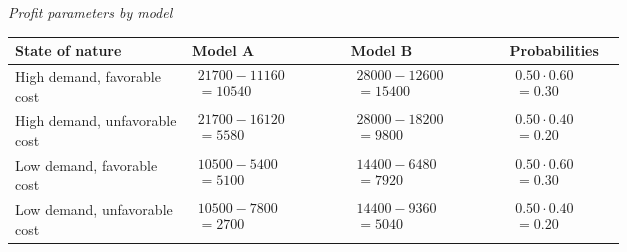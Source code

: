 		\begin{center}
			\textit{Profit parameters by model} \\
			\begin{tabular}{l p{0.26\linewidth} p{0.26\linewidth} p{0.19\linewidth}}
				\toprule
				State of nature & Model A & Model B & Probabilities \\
				\midrule
				High demand, favorable cost &
				$\begin{array}{l}
					21700 - 11160\\
					= 10540
				\end{array}$ &
				$\begin{array}{l}
					28000 - 12600\\
					= 15400
				\end{array}$ &
				$\begin{array}{l}
					0.50 \cdot 0.60\\
					= 0.30
				\end{array}$ \\
				High demand, unfavorable cost &
				$\begin{array}{l}
					21700 - 16120\\
					= 5580
				\end{array}$ &
				$\begin{array}{l}
					28000 - 18200\\
					= 9800
				\end{array}$ &
				$\begin{array}{l}
					0.50 \cdot 0.40\\
					= 0.20
				\end{array}$ \\
				Low demand, favorable cost &
				$\begin{array}{l}
					10500 - 5400\\
					= 5100
				\end{array}$ &
				$\begin{array}{l}
					14400 - 6480\\
					= 7920
				\end{array}$ &
				$\begin{array}{l}
					0.50 \cdot 0.60\\
					= 0.30
				\end{array}$ \\
				Low demand, unfavorable cost &
				$\begin{array}{l}
					10500 - 7800\\
					= 2700
				\end{array}$ &
				$\begin{array}{l}
					14400 - 9360\\
					= 5040
				\end{array}$ &
				$\begin{array}{l}
					0.50 \cdot 0.40\\
					= 0.20
				\end{array}$ \\
				\bottomrule
			\end{tabular}
		\end{center}

